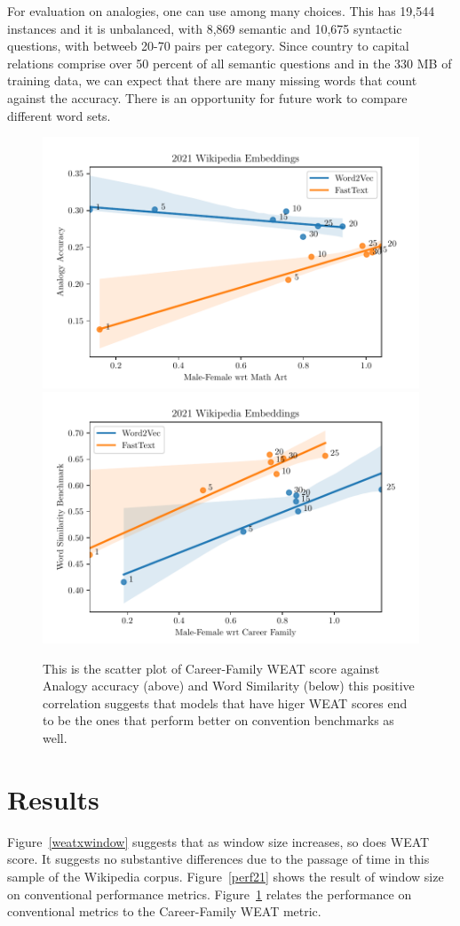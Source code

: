 \documentclass[11pt,a4paper]{article}
\begin{document}
For evaluation on analogies, one can use \citep{mikolov2013distributed} among
many choices. This has 19,544 instances and it is unbalanced, with 8,869
semantic and 10,675 syntactic questions, with betweeb 20-70 pairs per category.
Since country to capital relations comprise over 50 percent of all semantic
questions and in the 330 MB of training data, we can expect that there are many
missing words that count against the accuracy. There is an opportunity for
future work to compare different word sets.



\begin{figure}
  \includegraphics[width=.5\textwidth]{figures/analogy-avg_x_math-art_2021.pdf}
  \includegraphics[width=.5\textwidth]{figures/car-fam_x_wordsim_2021.pdf}
  \caption{This is the scatter plot of Career-Family WEAT score against Analogy
    accuracy (above) and Word Similarity (below) this positive correlation
    suggests that models that have higer WEAT scores end to be the ones that
    perform better on convention benchmarks as well. \label{biasxperf}}
\end{figure}

\section{Results}

Figure~\ref{weatxwindow} suggests that as window size increases, so does WEAT
score. It suggests no substantive differences due to the passage of time in this
sample of the Wikipedia corpus. Figure~\ref{perf21} shows the result of window
size on conventional performance metrics. Figure~\ref{biasxperf} relates the
performance on conventional metrics to the Career-Family WEAT metric.
\end{document}
